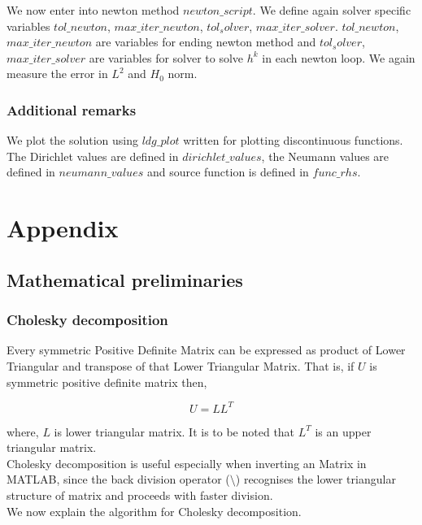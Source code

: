 \documentclass[a4paper,12pt]{book}
\begin{document}
We now enter into newton method $newton\_script$. We define again solver specific variables $tol\_newton$, $max\_iter\_newton$, $tol_solver$, $max\_iter\_solver$. $tol\_newton$, $max\_iter\_newton$ are variables for ending newton method and $tol_solver$, $max\_iter\_solver$ are variables for solver to solve $h^k$ in each newton loop. We again measure the error in $L^2$ and $H_0$ norm.\\

\subsection{Additional remarks}

We plot the solution using  $ldg\_plot$ written for plotting discontinuous functions. The Dirichlet values are defined in $dirichlet\_values$, the Neumann values are defined in $neumann\_values$ and source function is defined in $func\_rhs$. 

\chapter{Appendix}

\section{Mathematical preliminaries}

\subsection{Cholesky decomposition} \label{chol}

Every symmetric Positive Definite Matrix can be expressed as product of Lower Triangular and transpose of that Lower Triangular Matrix. That is, if $U$ is symmetric positive definite matrix then,

\begin{equation}
U = LL^T
\end{equation}

where, $L$ is lower triangular matrix. It is to be noted that $L^T$ is an upper triangular matrix. \\

Cholesky decomposition is useful especially when inverting an Matrix in MATLAB, since the back division operator ($\setminus$) recognises the lower triangular structure of matrix and proceeds with faster division.\\

We now explain the algorithm for Cholesky decomposition. \\
\end{document}
